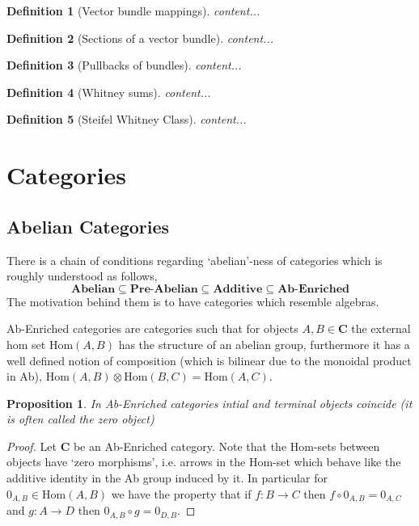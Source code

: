 \documentclass[12pt]{article}
\numberwithin{equation}{section}
\newcommand{\Hom}{{\mathrm{Hom}}}
\newtheorem{definition}{Definition}[section]
\newtheorem{proposition}{Proposition}[section]
\begin{document}
\begin{appendices}
	\begin{definition}[Vector bundle mappings]
		content...
	\end{definition}
	
	\begin{definition}[Sections of a vector bundle]
		content...
	\end{definition}
	
	\begin{definition}[Pullbacks of bundles]
		content...
	\end{definition}
	
	\begin{definition}[Whitney sums]
		content...
	\end{definition}
	
	\begin{definition}[Steifel Whitney Class]
		content...
	\end{definition}
	\section{Categories}
	\subsection{Abelian Categories}
	There is a chain of conditions regarding `abelian'-ness of categories which is roughly understood as follows,
	\[ \textbf{Abelian} \subseteq \textbf{Pre-Abelian} \subseteq \textbf{Additive} \subseteq \textbf{Ab-Enriched}\]
	The motivation behind them is to have categories which resemble algebras.
	
	Ab-Enriched categories are categories such that for objects $A,B \in \mathbf{C}$ the external hom set $\Hom(A,B)$ has the structure of an abelian group, furthermore it has a well defined notion of composition (which is bilinear due to the monoidal product in Ab), $\Hom(A,B)\otimes \Hom(B,C) =\Hom(A,C)$. 
	\begin{proposition}
		In Ab-Enriched categories intial and terminal objects coincide (it is often called the zero object)
	\end{proposition}
	\begin{proof}
		Let $\mathbf{C}$ be an Ab-Enriched category. Note that the Hom-sets between objects have `zero morphisms', i.e. arrows in the Hom-set which behave like the additive identity in the Ab group induced by it. In particular for $0_{A,B}\in \Hom(A,B)$ we have the property that if $f:B \to C$ then $f\circ 0_{A,B}=0_{A,C}$ and $g: A \to D$ then $0_{A,B}\circ g=0_{D,B}$.
		

\end{proof}
\end{appendices}
\end{document}
